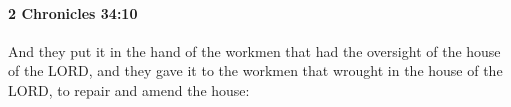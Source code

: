 
		\paragraph{2 Chronicles 34:10} %
			\label{2CHRONICLES-34-10}

			And they put it in the hand of the workmen that had the oversight of the house of the LORD, and they gave it to the workmen that wrought in the house of the LORD, to repair and amend the house:


